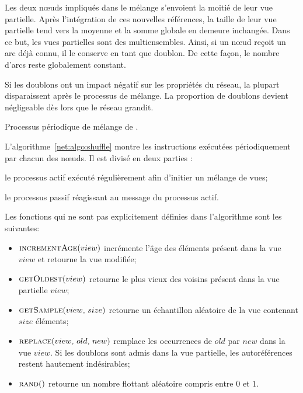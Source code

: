 Les deux nœuds impliqués dans le mélange s'envoient la moitié de leur vue
partielle. Après l'intégration de ces nouvelles références, la taille de leur
vue partielle tend vers la moyenne et la somme globale en demeure
inchangée. Dans ce but, les vues partielles sont des multiensembles. Ainsi, si
un nœud reçoit un arc déjà connu, il le conserve en tant que doublon.  De cette
façon, le nombre d'arcs reste globalement constant.

Si les doublons ont un impact négatif sur les propriétés du réseau, la plupart
disparaissent après le processus de mélange. La proportion de doublons devient
négligeable dès lors que le réseau grandit.

\begin{algorithm}[h]
  
  \caption[Processus périodique de mélange de \SPRAY]
  {\label{net:algo:shuffle}Processus périodique de mélange de \SPRAY.}
\end{algorithm}

L'algorithme~\ref{net:algo:shuffle} montre les instructions exécutées
périodiquement par chacun des nœuds. Il est divisé en deux parties :
\begin{inparaenum}[(i)]
\item le processus actif exécuté régulièrement afin d'initier un mélange de vues;
\item le processus passif réagissant au message du processus actif.
\end{inparaenum}

\noindent Les fonctions qui ne sont pas explicitement définies dans l'algorithme
sont les suivantes:
\begin{itemize}
\item $\textsc{incrementAge}(view)$ incrémente l'âge des éléments présent
  dans la vue $view$ et retourne la vue modifiée;
\item $\textsc{getOldest}(view)$ retourne le plus vieux des voisins présent
  dans la vue partielle $view$;
\item $\textsc{getSample}(view,\, size)$ retourne un échantillon aléatoire de la
  vue contenant $size$ éléments;
\item $\textsc{replace}(view,\,old,\,new)$ remplace les occurrences de $old$
  par $new$ dans la vue $view$. Si les doublons sont admis dans la vue
  partielle, les autoréférences restent hautement indésirables;
\item $\textsc{rand}()$ retourne un nombre flottant aléatoire compris entre $0$
  et $1$.
\end{itemize}

